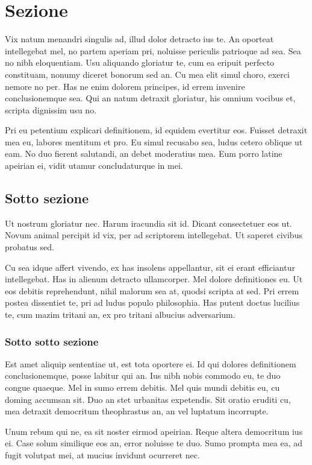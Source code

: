 \documentclass[11pt, a4paper, twoside, openright]{book}
\begin{document}
\section{Sezione}
Vix natum menandri singulis ad, illud dolor detracto ius te. An oporteat
intellegebat mel, no partem aperiam pri, noluisse periculis patrioque ad sea.
Sea no nibh eloquentiam. Usu aliquando gloriatur te, cum ea eripuit perfecto
constituam, nonumy diceret bonorum sed an. Cu mea elit simul choro, exerci
nemore no per. Has ne enim dolorem principes, id errem invenire conclusionemque
sea. Qui an natum detraxit gloriatur, his omnium vocibus et, scripta dignissim
usu no.

Pri eu petentium explicari definitionem, id equidem evertitur eos. Fuisset
detraxit mea eu, labores mentitum et pro. Eu simul recusabo sea, ludus cetero
oblique ut eam. No duo fierent salutandi, an debet moderatius mea. Eum porro
latine apeirian ei, vidit utamur concludaturque in mei.

\subsection{Sotto sezione}
Ut nostrum gloriatur nec. Harum iracundia sit id. Dicant consectetuer eos ut.
Novum animal percipit id vix, per ad scriptorem intellegebat. Ut saperet civibus
probatus sed.

Cu sea idque affert vivendo, ex has insolens appellantur, sit ei erant
efficiantur intellegebat. Has in alienum detracto ullamcorper. Mel dolore
definitiones eu. Ut eos debitis reprehendunt, nihil malorum sea at, quodsi
scripta at sed. Pri errem postea dissentiet te, pri ad ludus populo philosophia.
Has putent doctus lucilius te, cum mazim tritani an, ex pro tritani albucius
adversarium.

\subsubsection{Sotto sotto sezione}
Est amet aliquip sententiae ut, est tota oportere ei. Id qui dolores
definitionem conclusionemque, posse labitur qui an. Ius nibh nobis commodo eu,
te duo congue quaeque. Mel in sumo errem debitis. Mel quis mundi debitis eu, cu
doming accumsan sit. Duo an stet urbanitas expetendis. Sit oratio eruditi cu,
mea detraxit democritum theophrastus an, an vel luptatum incorrupte.

Unum rebum qui ne, ea sit noster eirmod apeirian. Reque altera democritum ius
ei. Case solum similique eos an, error noluisse te duo. Sumo prompta mea ea, ad
fugit volutpat mei, at mucius invidunt ocurreret nec.
\end{document}
